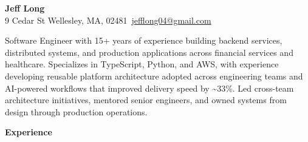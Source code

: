 \documentclass[10pt]{article}
\begin{document}
  \fontsize{9}{10.5}\selectfont
  \begin{center}
    \textbf{\LARGE Jeff Long} \\
  9 Cedar St Wellesley, MA, 02481~\href{mailto:jefflong04@gmail.com}{jefflong04@gmail.com} \\
  \end{center}

  Software Engineer with 15+ years of experience building backend services, distributed systems, and production applications across financial services and healthcare. Specializes in TypeScript, Python, and AWS, with experience developing reusable platform architecture adopted across engineering teams and AI-powered workflows that improved delivery speed by \textasciitilde{}33\%. Led cross-team architecture initiatives, mentored senior engineers, and owned systems from design through production operations.

  \vspace{0.5em}
  {\large \textbf{Experience}}
\end{document}
